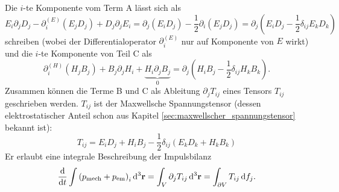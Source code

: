 Die $i$-te Komponente vom Term A lässt sich als
\begin{equation*}
	E_{i}\partial _{j}D_{j}-\partial _{i}^{\left(E\right)}\left(E_{j}D_{j}\right)+D_{j}\partial _{j}E_{i}=\partial _{j}\left(E_{i}D_{j}\right)-\frac{1}{2}\partial _{i}\left(E_{j}D_{j}\right)=\partial _{j}\left(E_{i}D_{j}-\frac{1}{2}\delta _{ij}E_{k}D_{k}\right)
\end{equation*}
schreiben (wobei der Differentialoperator $\partial _{i}^{\left(E\right)}$ nur auf Komponente von $E$ wirkt) und die $i$-te Komponente von Teil C als
\begin{equation*}
	\partial _{i}^{\left(H\right)}\left(H_{j}B_{j}\right)+B_{j}\partial _{j}H_{i}+\underset{0}{\underbrace{H_{i}\partial _{j}B_{j}}}=\partial _{j}\left(H_{i}B_{j}-\frac{1}{2}\delta _{ij}H_{k}B_{k}\right).
\end{equation*}
Zusammen können die Terme B und C als Ableitung $\partial _{j}T_{ij}$ eines Tensors $T_{ij}$ geschrieben werden. $T_{ij}$ ist der Maxwellsche Spannungstensor (dessen elektrostatischer Anteil schon aus Kapitel \ref{sec:maxwellscher_spannungstensor} bekannt ist):
\begin{equation*}
	T_{ij}=E_{i}D_{j}+H_{i}B_{j}-\frac{1}{2}\delta _{ij}\left(E_{k}D_{k}+H_{k}B_{k}\right)
\end{equation*}
Er erlaubt eine integrale Beschreibung der Impulsbilanz
\begin{equation*}
	\frac{\mathop{}\!\mathrm{d} }{\mathop{}\!\mathrm{d} t}\int \left(p_{\text{mech}}+p_{\mathrm{em}}\right)_{i}\mathop{}\!\mathrm{d} ^{3}\mathbf{r}=\int _{V}\partial _{j}T_{ij}\mathop{}\!\mathrm{d} ^{3}\mathbf{r}=\int _{\partial V}T_{ij}\mathop{}\!\mathrm{d} f_{j}.
\end{equation*}
